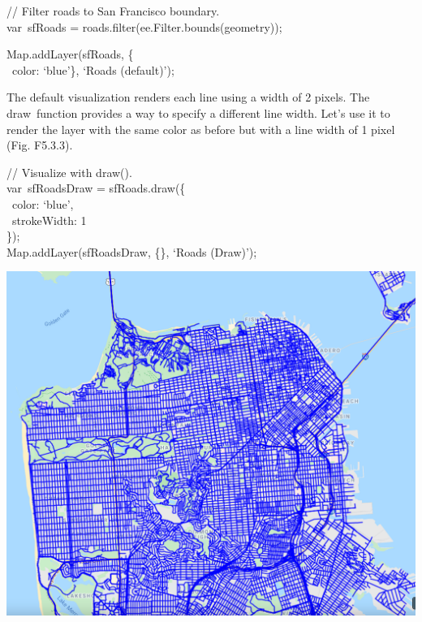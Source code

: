 \documentclass[
  letterpaper,
  DIV=11,
  numbers=noendperiod]{scrreprt}
\begin{document}
// Filter roads to San Francisco boundary.\\
var~sfRoads = roads.filter(ee.Filter.bounds(geometry));

Map.addLayer(sfRoads, \{\\
\hspace*{0.333em} ~color: `blue'\}, `Roads (default)');

The default visualization renders each line using a width of 2 pixels.
The draw~function provides a way to specify a different line width.
Let's use it to render the layer with the same color as before but with
a line width of 1 pixel (Fig. F5.3.3).

// Visualize with draw().\\
var~sfRoadsDraw = sfRoads.draw(\{\\
\hspace*{0.333em} ~color: `blue',\\
\hspace*{0.333em} ~strokeWidth: 1\\
\});\\
Map.addLayer(sfRoadsDraw, \{\}, `Roads (Draw)');

\includegraphics{./F5/image28.png}
\end{document}
